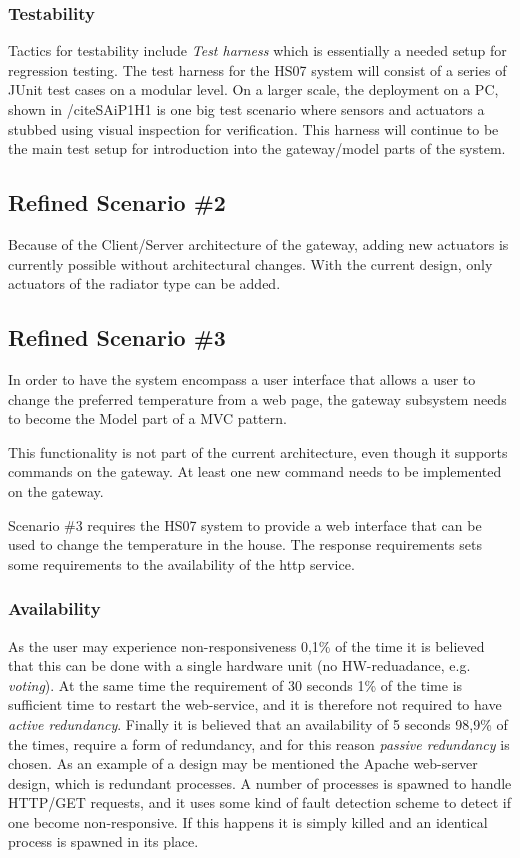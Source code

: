 \documentclass[a4paper,10pt]{article}
\begin{document}
\subsubsection{Testability}
Tactics for testability include \emph{Test harness} which is essentially a needed setup for regression testing. The test harness for the HS07 system will consist of a series of JUnit test cases on a modular level. On a larger scale, the deployment on a PC, shown in /cite{SAiP1H1} is one big test scenario where sensors and actuators a stubbed using visual inspection for verification. This harness will continue to be the main test setup for introduction into the gateway/model parts of the system.


\subsection{Refined Scenario \#2}
Because of the Client/Server architecture of the gateway, adding new actuators is currently possible without architectural changes. With the current design, only actuators of the radiator type can be added.

\subsection{Refined Scenario \#3}
In order to have the system encompass a user interface that allows a user to change the preferred temperature from a web page, the gateway subsystem needs to become the Model part of a MVC pattern.

This functionality is not part of the current architecture, even though it supports commands on the gateway. At least one new command needs to be implemented on the gateway.

Scenario \#3 requires the HS07 system to provide a web interface that can be used to change the temperature in the house. The response requirements sets some requirements to the availability of the http service.

\subsubsection{Availability}
As the user may experience non-responsiveness 0,1\% of the time it is believed that this can be done with a single hardware unit (no HW-reduadance, e.g. \emph{voting}). At the same time the requirement of 30 seconds 1\% of the time is sufficient time to restart the web-service, and it is therefore not required to have \emph{active redundancy}. Finally it is believed that an availability of 5 seconds 98,9\% of the times, require a form of redundancy, and for this reason \emph{passive redundancy} is chosen. As an example of a design may be mentioned the Apache web-server design, which is redundant processes. A number of processes is spawned to handle HTTP/GET requests, and it uses some kind of fault detection scheme to detect if one become non-responsive. If this happens it is simply killed and an identical process is spawned in its place.
\end{document}
